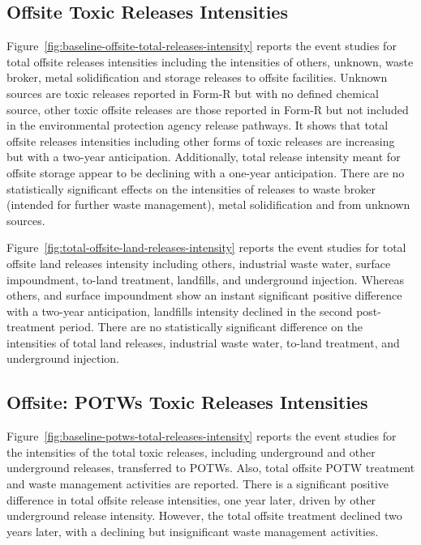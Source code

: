 \documentclass[numsec,webpdf,contemporary,large,namedate]{oup-authoring-template}%
\begin{document}
    \subsection{Offsite Toxic Releases Intensities}\label{subsec:offsite-toxic-releases-intensities}
    Figure~\ref{fig:baseline-offsite-total-releases-intensity} reports the event studies for total offsite releases intensities including the intensities of others, unknown, waste broker, metal solidification and storage releases to offsite facilities. Unknown sources are toxic releases reported in Form-R but with no defined chemical source, other toxic offsite releases are those reported in Form-R but not included in the environmental protection agency release pathways. It shows that total offsite releases intensities including other forms of toxic releases are increasing but with a two-year anticipation. Additionally, total release intensity meant for offsite storage appear to be declining with a one-year anticipation. There are no statistically significant effects on the intensities of releases to waste broker (intended for further waste management), metal solidification and from unknown sources.
    

    Figure~\ref{fig:total-offsite-land-releases-intensity} reports the event studies for total offsite land releases intensity including others, industrial waste water, surface impoundment, to-land treatment, landfills, and underground injection. Whereas others, and surface impoundment show an instant significant positive difference with a two-year anticipation, landfills intensity declined in the second post-treatment period. There are no statistically significant difference on the intensities of total land releases, industrial waste water, to-land treatment, and underground injection.
    

    \subsection{Offsite: POTWs Toxic Releases Intensities}\label{subsec:potws-toxic-releases-intensities}
    Figure~\ref{fig:baseline-potws-total-releases-intensity} reports the event studies for the intensities of the total toxic releases, including underground and other underground releases, transferred to POTWs. Also, total offsite POTW treatment and waste management activities are reported. There is a significant positive difference in total offsite release intensities, one year later, driven by other underground release intensity. However, the total offsite treatment declined two years later, with a declining but insignificant waste management activities.
    
\end{document}
